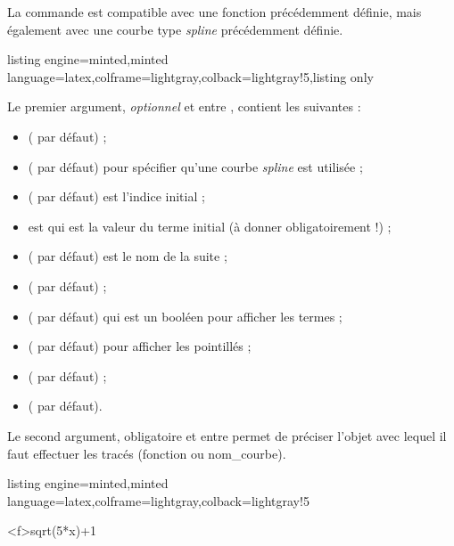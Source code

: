 \documentclass[11pt,a4paper]{ltxdoc}
\begin{document}
La commande est compatible avec une fonction précédemment définie, mais également avec une courbe type \textit{spline} précédemment définie.

\begin{tcblisting}{listing engine=minted,minted language=latex,colframe=lightgray,colback=lightgray!5,listing only}
\end{tcblisting}

Le premier argument, \textit{optionnel} et entre \MontreCode{[...]}, contient les  suivantes :

\begin{itemize}
  \item {} ( par défaut) ;
  \item {} ( par défaut) pour spécifier qu'une courbe \textit{spline} est utilisée ;
  \item {} ( par défaut) est l'indice initial ;
  \item {} est qui est la valeur du terme initial (à donner obligatoirement !) ;
  \item {} ( par défaut) est le nom de la suite ;
  \item {} ( par défaut) ;
  \item {} ( par défaut) qui est un booléen pour afficher les termes ;
  \item {} ( par défaut) pour afficher les pointillés ;
  \item {} ( par défaut) ;
  \item {} ( par défaut).
\end{itemize}

Le second argument, obligatoire et entre  permet de préciser l'objet avec lequel il faut effectuer les tracés (fonction ou nom\_courbe).

\begin{tcblisting}{listing engine=minted,minted language=latex,colframe=lightgray,colback=lightgray!5}
\begin{GraphiqueTikz}%
  [x=0.75cm,y=0.75cm,Xmin=0,Xmax=10,Xgrille=1,Xgrilles=0.5,
  Ymin=0,Ymax=8,Ygrille=1,Ygrilles=0.5]
  \DefinirCourbe[Couleur=red,Nom=cf,Debut=0,Fin=10,Trace]<f>{sqrt(5*x)+1}
\end{GraphiqueTikz}
\end{tcblisting}
\end{document}
